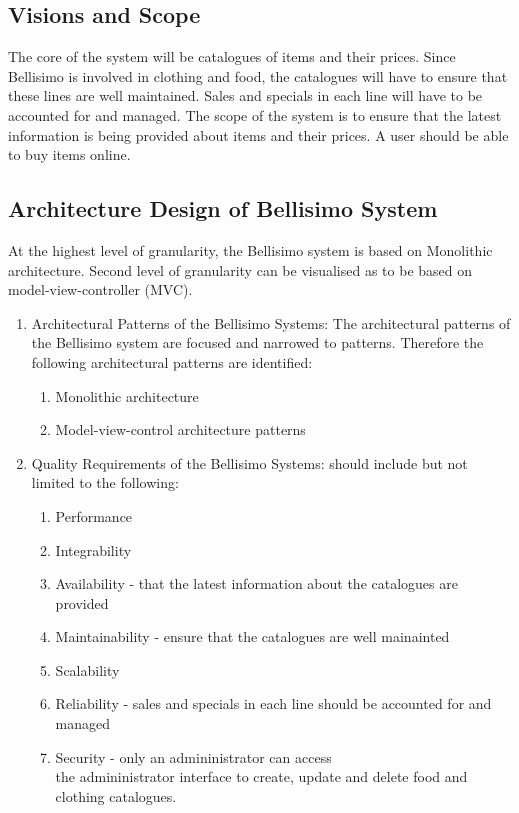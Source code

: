 \documentclass[12pt]{article}
\begin{document}
\subsection{Visions and Scope}
The core of the system will be catalogues of items and their prices. Since Bellisimo is involved in clothing and food, the catalogues will have to ensure that these lines are well maintained. Sales and specials in each line will have to be accounted for and managed. The scope of the system is to ensure that the latest information is being provided about items and their prices. A user should be able to buy items online.  

\subsection{Architecture Design of Bellisimo System}
At the highest level of granularity, the Bellisimo system is based on Monolithic architecture. Second level of granularity can be visualised as to be based on model-view-controller (MVC).

\begin{enumerate}
\item Architectural Patterns of the Bellisimo Systems: The architectural patterns of the Bellisimo system are focused and narrowed to patterns.   Therefore the   following architectural patterns are  identified: 
\newpage
\begin{enumerate}

\item Monolithic architecture 
\item Model-view-control architecture patterns 

\end{enumerate}
\item Quality Requirements of  the Bellisimo Systems: should include but not limited to the following:\begin{enumerate}
\item Performance 
\item Integrability
\item Availability - that the latest information about the catalogues are provided 
\item Maintainability - ensure that the catalogues are well mainainted 
\item Scalability
\item Reliability - sales and specials in each line should be accounted for and managed 
\item Security - only an admininistrator can access \\the admininistrator interface to create, update and delete food and clothing catalogues.

\end{enumerate}

\end{enumerate}
\end{document}

